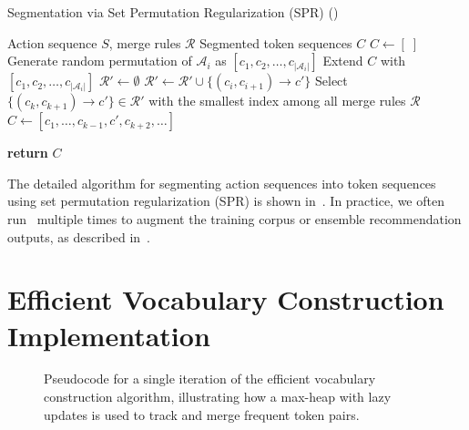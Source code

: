 \begin{algorithm}[!t]
\caption{Segmentation via Set Permutation Regularization (SPR) ()}
\label{alg:spr}
\begin{algorithmic}[1]
\INPUT Action sequence $S$, merge rules $\mathcal{R}$
\OUTPUT Segmented token sequences $C$
    \STATE $C \gets [\;]$ 
        \STATE Generate random permutation of $\mathcal{A}_i$ as $[c_1, c_2, \dots, c_{|\mathcal{A}_i|}]$
        \STATE Extend $C$ with $[c_1, c_2, \dots, c_{|\mathcal{A}_i|}]$ 
    \ENDFOR
    \STATE
    \STATE {}
    \REPEAT
        \STATE $\mathcal{R}' \gets \emptyset$ 
                \STATE $\mathcal{R}' \gets \mathcal{R}' \cup \{(c_i, c_{i+1}) \to c'\}$
            \ENDIF
        \ENDFOR
        \STATE Select $\{(c_k, c_{k+1}) \to c'\} \in \mathcal{R}'$ with the smallest index among all merge rules $\mathcal{R}$
        \STATE $C\gets [c_1, \dots, c_{k-1}, c', c_{k+2}, \dots]$ 
\item[\textbf{return} $C$]
\end{algorithmic}
\end{algorithm}

The detailed algorithm for segmenting action sequences into token sequences using set permutation regularization (SPR) is shown in~. In practice, we often run~ multiple times to augment the training corpus or ensemble recommendation outputs, as described in~.


\section{Efficient Vocabulary Construction Implementation}\label{sec:vocab_construct_algo}

\begin{figure}[!t]

\caption{Pseudocode for a single iteration of the efficient vocabulary construction algorithm, illustrating how a max-heap with lazy updates is used to track and merge frequent token pairs.} 
\label{fig:torch_implementation}
\end{figure}

